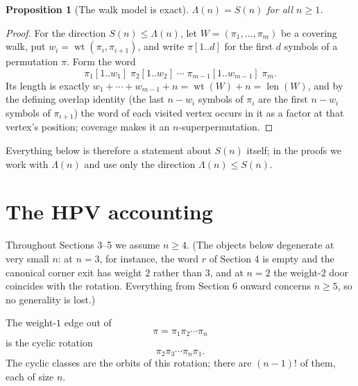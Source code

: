 \documentclass[11pt]{article}
\newtheorem{proposition}[theorem]{Proposition}
\DeclareMathOperator{\wt}{wt}
\DeclareMathOperator{\len}{len}
\begin{document}
\begin{proposition}[The walk model is exact]\label{prop:exactmodel}
\(\Lambda(n)=S(n)\) for all \(n\ge1\).
\end{proposition}

\begin{proof}
For the direction \(S(n)\le\Lambda(n)\), let \(W=(\pi_1,\ldots,\pi_m)\) be a covering walk,
put \(w_i=\wt(\pi_i,\pi_{i+1})\), and write \(\pi[1..d]\) for the first \(d\) symbols of a
permutation \(\pi\).  Form the word
\[
  \pi_1[1..w_1]\;\pi_2[1..w_2]\;\cdots\;\pi_{m-1}[1..w_{m-1}]\;\pi_m .
\]
Its length is exactly \(w_1+\cdots+w_{m-1}+n=\wt(W)+n=\len(W)\), and by the defining overlap
identity (the last \(n-w_i\) symbols of \(\pi_i\) are the first \(n-w_i\) symbols of
\(\pi_{i+1}\)) the word of each visited vertex occurs in it as a factor at that vertex's
position; coverage makes it an \(n\)-superpermutation.
\end{proof}

Everything below is therefore a statement about \(S(n)\) itself;
in the proofs we work with \(\Lambda(n)\) and use only the direction \(\Lambda(n)\le S(n)\).

\section{The HPV accounting}

Throughout Sections 3--5 we assume \(n\ge 4\).  (The objects below degenerate at very
small \(n\): at \(n=3\), for instance, the word \(r\) of Section 4 is empty and the
canonical corner exit has weight \(2\) rather than \(3\), and at \(n=2\) the weight-\(2\)
door coincides with the rotation.  Everything from Section 6 onward concerns \(n\ge 5\),
so no generality is lost.)

The weight-\(1\) edge out of
\[
  \pi=\pi_1\pi_2\cdots\pi_n
\]
is the cyclic rotation
\[
  \pi_2\pi_3\cdots\pi_n\pi_1.
\]
The cyclic classes are the orbits of this rotation; there are \((n-1)!\) of them, each of size \(n\).
\end{document}
